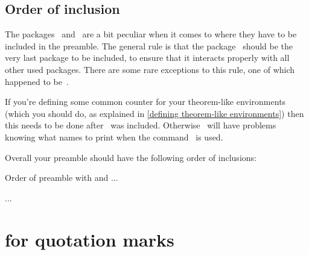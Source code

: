 \subsection{Order of inclusion}

The packages~ and~ are a bit peculiar when it comes to where they have to be included in the preamble.
The general rule is that the package~ should be the very last package to be included, to ensure that it interacts properly with all other used packages.
There are some rare exceptions to this rule, one of which happened to be~.

If you’re defining some common counter for your theorem-like environments (which you should do, as explained in \cref{defining theorem-like environments}) then this needs to be done after~ was included.
Otherwise~ will have problems knowing what names to print when the command~ is used.

Overall your preamble should have the following order of inclusions:
\begin{showcode}{Order of preamble with  and }
...
\usepackage{amsthm}
...

\usepackage{hyperref}
\usepackage{cleveref}

\newtheorem{theorem}[everything]{Theorem}
\end{showcode}





\section{ for quotation marks}

